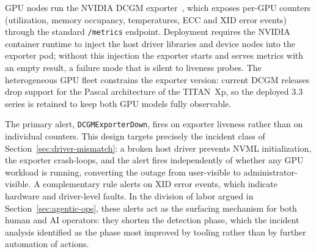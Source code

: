 GPU nodes run the NVIDIA DCGM exporter~\citep{dcgm}, which exposes per-GPU counters (utilization, memory occupancy, temperatures, ECC and XID error events) through the standard \texttt{/metrics} endpoint. Deployment requires the NVIDIA container runtime to inject the host driver libraries and device nodes into the exporter pod; without this injection the exporter starts and serves metrics with an empty result, a failure mode that is silent to liveness probes. The heterogeneous GPU fleet constrains the exporter version: current DCGM releases drop support for the Pascal architecture of the TITAN~Xp, so the deployed 3.3 series is retained to keep both GPU models fully observable.

The primary alert, \texttt{DCGMExporterDown}, fires on exporter liveness rather than on individual counters. This design targets precisely the incident class of Section~\ref{sec:driver-mismatch}: a broken host driver prevents NVML initialization, the exporter crash-loops, and the alert fires independently of whether any GPU workload is running, converting the outage from user-visible to administrator-visible. A complementary rule alerts on XID error events, which indicate hardware and driver-level faults. In the division of labor argued in Section~\ref{sec:agentic-ops}, these alerts act as the surfacing mechanism for both human and AI operators: they shorten the detection phase, which the incident analysis identified as the phase most improved by tooling rather than by further automation of actions.
